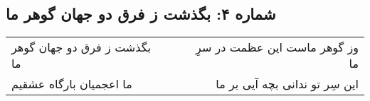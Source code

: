 \begin{center}
\section*{شماره ۴: بگذشت ز فرق دو جهان گوهر ما}
\label{sec:004}
\begin{longtable}{l p{0.5cm} r}
بگذشت ز فرق دو جهان گوهر ما
&&
وز گوهر ماست این عظمت در سرِ ما
\\
ما اعجمیان بارگاه عشقیم
&&
این سِر تو ندانی بچه آیی بر ما
\\
\end{longtable}
\end{center}

